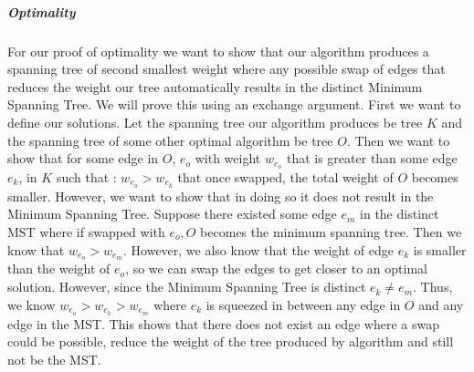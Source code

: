 \documentclass[10pt]{article}
\begin{document}
{\subparagraph{Optimality} For our proof of optimality we want to show that our algorithm produces a spanning tree of second smallest weight where any possible swap of edges that reduces the 
weight our tree automatically results in the distinct Minimum Spanning Tree. We will prove this using an exchange argument. First we want to define our solutions. Let 
the spanning tree our algorithm produces be tree $K$ and the spanning tree of some other optimal algorithm be tree $O$. Then we want to show that for some edge in $O$, $e_o$ with 
weight $w_{e_o}$ that is greater than some edge $e_k$, in $K$ such that : $w_{e_o} > w_{e_k}$ that once swapped, the total weight of $O$ becomes smaller. However, we want to show that in doing so it does not
result in the Minimum Spanning Tree.  Suppose there existed some edge $e_m$ in the distinct MST where if swapped with $e_o, O$ becomes the minimum spanning tree. Then we know that $w_{e_o} > w_{e_m}$. However, 
we also know that the weight of edge $e_k$ is smaller than the weight of $e_o$, so we can swap the edges to get closer to an optimal solution. However, since the Minimum Spanning Tree is distinct $e_k \neq e_m$. Thus, we know
$w_{e_o} > w_{e_k} > w_{e_m}$ where $e_k$ is squeezed in between any edge in $O$ and any edge in the MST. This shows that there does not exist an edge where a swap could be possible, reduce the weight of the tree produced by algorithm
and still not be the MST. 

}

\newpage
\medskip{}

\newpage
\medskip{}

\end{document}
